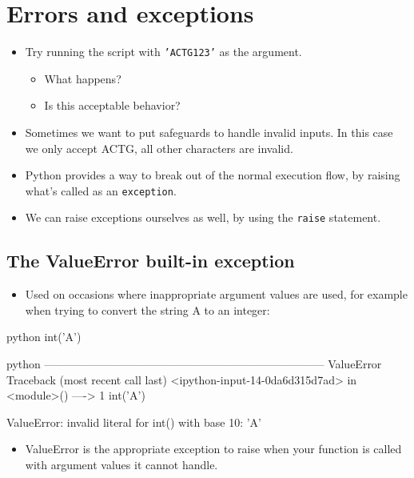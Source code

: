 \documentclass[aspectratio=1610,slidestop]{beamer}
\begin{document}
\section{Errors and exceptions}

\begin{pframe}
 \begin{itemize}
  \item Try running the script with \texttt{'ACTG123'} as the
  argument.
  \begin{itemize}
   \item What happens?
   \item Is this acceptable behavior?
  \end{itemize}
  \item Sometimes we want to put safeguards to handle invalid inputs. In this
  case we only accept ACTG, all other characters are invalid.
  \item Python provides a way to break out of the normal execution flow, by
  raising what's called as an \texttt{exception}.
  \item We can raise exceptions ourselves as well, by using the
  \texttt{raise} statement.
 \end{itemize}
\end{pframe}


\subsection{The ValueError built-in exception}

\begin{pframe}
 \begin{itemize}
  \item Used on occasions where inappropriate argument values are used,
  for example when trying to convert the string A to an integer:
 \end{itemize}
 \begin{ipython}
   \begin{pythonin}{python}
int('A')
   \end{pythonin}
   \begin{pythonerr}{python}
---------------------------------------------------------------------------
ValueError                                Traceback (most recent call last)
<ipython-input-14-0da6d315d7ad> in <module>()
----> 1 int('A')

ValueError: invalid literal for int() with base 10: 'A'
   \end{pythonerr}
 \end{ipython}
 \begin{itemize}
  \item ValueError is the appropriate exception to raise when your function is
  called with argument values it cannot handle.
 \end{itemize}
\end{pframe}
\end{document}
